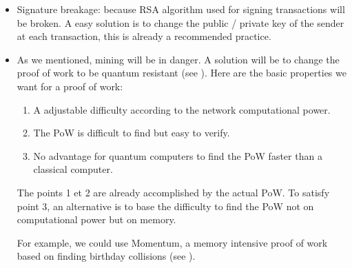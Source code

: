 \begin{itemize}
  \item Signature breakage: because RSA algorithm used for signing transactions will be broken. A easy solution is to change the public / private key of the sender at each transaction, this is already a recommended practice.
  \item As we mentioned, mining will be in danger. A solution will be to change the proof of work to be quantum resistant (see \cite{quantum_attacks}). Here are the basic properties we want for a proof of work: \newline

  \begin{enumerate}
    \item A adjustable difficulty according to the network computational power.
    \item The PoW is difficult to find but easy to verify.
    \item No advantage for quantum computers to find the PoW faster than a classical computer.
  \end{enumerate}
  \medskip

  The points 1 et 2 are already accomplished by the actual PoW. To satisfy point 3, an alternative is to base the difficulty to find the PoW not on computational power but on memory. \newline

  For example, we could use Momentum, a memory intensive proof of work based on finding birthday collisions (see \cite{momentum}). 
\end{itemize}
